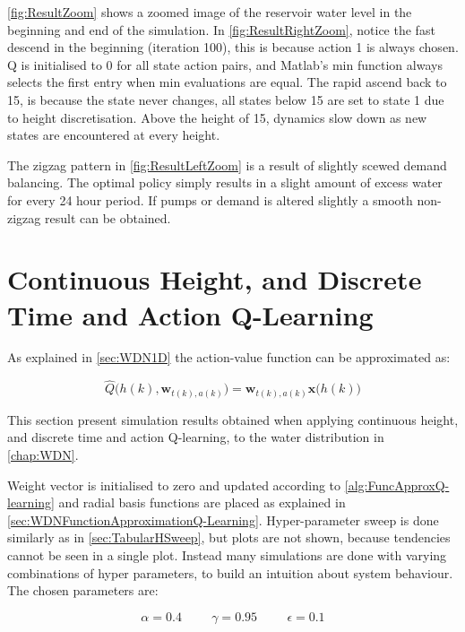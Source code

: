 \cref{fig:ResultZoom} shows a zoomed image of the reservoir water level in the beginning and end of the simulation. In \cref{fig:ResultRightZoom}, notice the fast descend in the beginning (iteration 100), this is because action 1 is always chosen. Q is initialised to 0 for all state action pairs, and Matlab's min function always selects the first entry when min evaluations are equal. The rapid ascend back to 15, is because the state never changes, all states below 15 are set to state 1 due to height discretisation. Above the height of 15, dynamics slow down as new states are encountered at every height. 

The zigzag pattern in \cref{fig:ResultLeftZoom} is a result of slightly scewed demand balancing. The optimal policy simply results in a slight amount of excess water for every 24 hour period. If pumps or demand is altered slightly a smooth non-zigzag result can be obtained.

\clearpage \newpage

\section{Continuous Height, and Discrete Time and Action Q-Learning}\label{sec:sim1D}

As explained in \cref{sec:WDN1D} the action-value function can be approximated as:

\begin{equation}
	\hat{Q}\bigg(h(k),\textbf{w}_{t(k),a(k)}\bigg) =  \textbf{w}_{t(k),a(k)}\textbf{x}\bigg(h(k)\bigg)
\end{equation}

This section present simulation results obtained when applying continuous height, and discrete time and action Q-learning, to the water distribution in \cref{chap:WDN}. 

Weight vector is initialised to zero and updated according to \cref{alg:FuncApproxQ-learning} and radial basis functions are placed as explained in \cref{sec:WDNFunctionApproximationQ-Learning}. Hyper-parameter sweep is done similarly as in \cref{sec:TabularHSweep}, but plots are not shown, because tendencies cannot be seen in a single plot. Instead many simulations are done with varying combinations of hyper parameters, to build an intuition about system behaviour. The chosen parameters are:

\begin{equation*}
	\alpha = 0.4 \hspace{1cm} \gamma = 0.95 \hspace{1cm} \epsilon = 0.1
\end{equation*}

